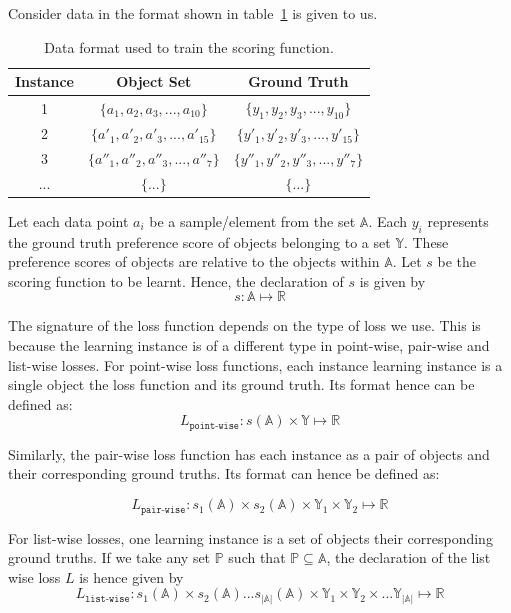 \documentclass[12pt, twoside, ngerman]{report}
\begin{document}
Consider data in the format shown in table~\ref{tab:dataformat} is given to us.

\begin{table} [ht]
\centering
\begin{tabular}{ | c | c | c | }
  \toprule
  Instance & Object Set & Ground Truth \\ \midrule
  1 & $\{a_1, a_2, a_3, ... , a_{10}\}$  & $\{y_1, y_2, y_3, ... , y_{10}\}$  \\
  2 & $\{a'_1, a'_2, a'_3, ... , a'_{15}\}$ & $\{y'_1, y'_2, y'_3, ... , y'_{15}\}$  \\
  3 & $\{a''_1, a''_2, a''_3, ... , a''_{7}\}$ & $\{y''_1, y''_2, y''_3, ... , y''_{7}\}$  \\
  ... & $\{...\}$ & $\{...\}$ \\
  \bottomrule
\end{tabular}
\caption{Data format used to train the scoring function.}
\label {tab:dataformat}
\end{table}
Let each data point $a_i$ be a sample/element from the set $\mathbb{A}$.
Each $y_i$ represents the ground truth preference score of objects belonging to a set $\mathbb{Y}$.
These preference scores of objects are relative to the objects within $\mathbb{A}$.
Let $s$ be the scoring function to be learnt.
Hence, the declaration of $s$ is given by
$$
s : \mathbb{A} \mapsto \mathbb{R}
$$

The signature of the loss function depends on the type of loss we use.
This is because the learning instance is of a different type in point-wise, pair-wise and list-wise losses.
For point-wise loss functions,  each instance learning instance is a single object the loss function and its ground truth.  Its format hence can be defined as:
\begin{equation}
L_{\texttt{point-wise}} : s(\mathbb{A}) \times \mathbb{Y} \mapsto \mathbb{R}
\end{equation}

Similarly,   the pair-wise loss function has each instance as a pair of objects and their corresponding ground truths.  Its format can hence be defined as:

\begin{equation}
L_{\texttt{pair-wise}} : s_1(\mathbb{A}) \times s_2(\mathbb{A}) \times \mathbb{Y}_1 \times \mathbb{Y}_2 \mapsto \mathbb{R}
\end{equation}

For list-wise losses,  one learning instance is a set of objects their corresponding ground truths.
If we take any set $\mathbb{P}$ such that $\mathbb{P} \subseteq \mathbb{A}$,  the declaration of the list wise loss $L$ is hence given by
\begin{equation}
L_{\texttt{list-wise}} : s_1(\mathbb{A}) \times s_2(\mathbb{A}) ...  s_{|\mathbb{A}|}(\mathbb{A}) \times \mathbb{Y}_1 \times \mathbb{Y}_2 \times ...  \mathbb{Y}_{|\mathbb{A}|} \mapsto \mathbb{R}
\end{equation}
\end{document}
